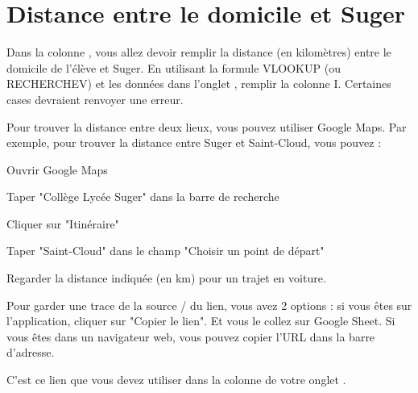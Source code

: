 \documentclass{exam}
\begin{document}
\section{Distance entre le domicile et Suger}

\begin{questions}
  \question Dans la colonne , vous allez devoir remplir la distance (en kilomètres) entre le domicile de l'élève et Suger. En utilisant la formule VLOOKUP (ou RECHERCHEV) et les données dans l'onglet , remplir la colonne I.
  \question Certaines cases devraient renvoyer une erreur. 
  \begin{Indication}
    Pour trouver la distance entre deux lieux, vous pouvez utiliser Google Maps. Par exemple, pour trouver la distance entre Suger et Saint-Cloud, vous pouvez : 
    \begin{compactitem}
      \item Ouvrir Google Maps
      \item Taper "Collège Lycée Suger" dans la barre de recherche
      \item Cliquer sur "Itinéraire"
      \item Taper "Saint-Cloud" dans le champ "Choisir un point de départ"
      \item Regarder la distance indiquée (en km) pour un trajet en voiture.
      \item Pour garder une trace de la source / du lien, vous avez 2 options : si vous êtes sur l'application, cliquer sur "Copier le lien". Et vous le collez sur Google Sheet. Si vous êtes dans un navigateur web, vous pouvez copier l'URL dans la barre d'adresse.
    \end{compactitem}
    \vspace{1em}
    C'est ce lien que vous devez utiliser dans la colonne  de votre onglet . \\
    

\end{Indication}
\end{questions}
\end{document}
